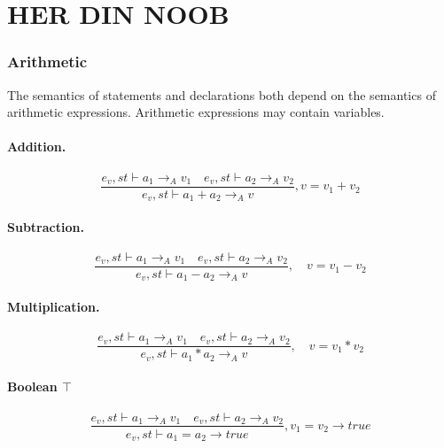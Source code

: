 \chapter{HER DIN NOOB}
\subsection*{Arithmetic}
The semantics of statements and declarations both depend on the semantics of arithmetic expressions.
Arithmetic expressions may contain variables.

\subsubsection{Addition.}
\begin{equation}
	\frac { { e }_{ v },st\vdash { a }_{ 1 }{ \rightarrow  }_{ A }{ v }_{ 1 }\quad { e }_{ v },st\vdash { a }_{ 2 }{ \rightarrow  }_{ A }{ v }_{ 2 } }{ { e }_{ v },st\vdash { a }_{ 1 }+{ a }_{ 2 }{ \rightarrow  }_{ A }{ v } } , v = { v }_{ 1 }+{ v }_{ 2 }
\end{equation}


\subsubsection{Subtraction.}
\begin{equation}
	\frac { { e }_{ v },st\vdash { a }_{ 1 }{ \rightarrow  }_{ A }{ v }_{ 1 }\quad { e }_{ v },st\vdash { a }_{ 2 }{ \rightarrow  }_{ A }{ v }_{ 2 } }{ { e }_{ v },st\vdash { a }_{ 1 }-{ a }_{ 2 }{ \rightarrow  }_{ A }{ v } } ,\quad v={ v }_{ 1 }-{ v }_{ 2 }
\end{equation}


\subsubsection{Multiplication.}
\begin{equation}
	\frac { { e }_{ v },st\vdash { a }_{ 1 }{ \rightarrow  }_{ A }{ v }_{ 1 }\quad { e }_{ v },st\vdash { a }_{ 2 }{ \rightarrow  }_{ A }{ v }_{ 2 } }{ { e }_{ v },st\vdash { a }_{ 1 }\ast { a }_{ 2 }{ \rightarrow  }_{ A }{ v } } ,\quad v={ v }_{ 1 }\ast { v }_{ 2 }
\end{equation}


\subsubsection{Boolean $\top$}
\begin{equation}
	\frac { { e }_{ v },st\vdash { a }_{ 1 }{ \rightarrow  }_{ A }{ v }_{ 1 }\quad { e }_{ v },st\vdash { a }_{ 2 }{ \rightarrow  }_{ A }{ v }_{ 2 } }{ { e }_{ v },st\vdash { a }_{ 1 }={ a }_{ 2 }{ \rightarrow  }true } ,{ v }_{ 1 }={ v }_{ 2 }\rightarrow true
\end{equation}


